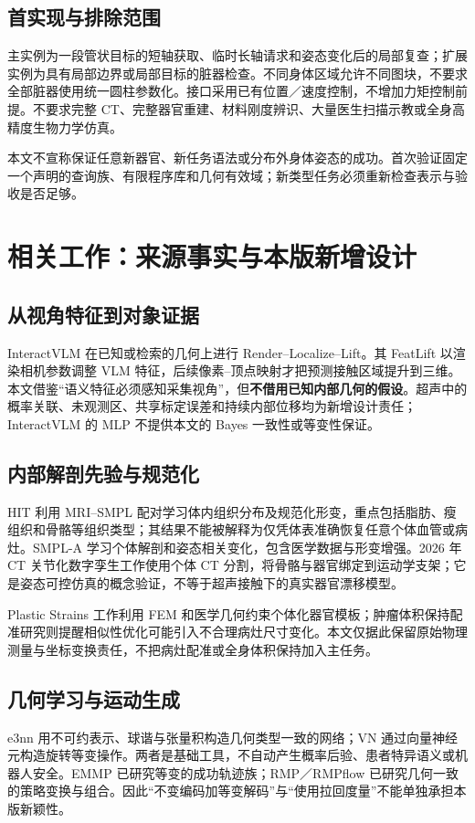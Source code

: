 \documentclass[UTF8,fontset=fandol,11pt,a4paper]{ctexart}
\theoremstyle{plain}
\theoremstyle{definition}
\theoremstyle{remark}
\numberwithin{equation}{section}
\begin{document}
\subsection{首实现与排除范围}
主实例为一段管状目标的短轴获取、临时长轴请求和姿态变化后的局部复查；扩展实例为具有局部边界或局部目标的脏器检查。不同身体区域允许不同图块，不要求全部脏器使用统一圆柱参数化。接口采用已有位置／速度控制，不增加力矩控制前提。不要求完整 CT、完整器官重建、材料刚度辨识、大量医生扫描示教或全身高精度生物力学仿真。

本文不宣称保证任意新器官、新任务语法或分布外身体姿态的成功。首次验证固定一个声明的查询族、有限程序库和几何有效域；新类型任务必须重新检查表示与验收是否足够。

\section{相关工作：来源事实与本版新增设计}
\label{sec:related}
\subsection{从视角特征到对象证据}
InteractVLM 在已知或检索的几何上进行 Render--Localize--Lift。其 FeatLift 以渲染相机参数调整 VLM 特征，后续像素--顶点映射才把预测接触区域提升到三维\cite{interact}。本文借鉴“语义特征必须感知采集视角”，但\textbf{不借用已知内部几何的假设}。超声中的概率关联、未观测区、共享标定误差和持续内部位移均为新增设计责任；InteractVLM 的 MLP 不提供本文的 Bayes 一致性或等变性保证。

\subsection{内部解剖先验与规范化}
HIT 利用 MRI--SMPL 配对学习体内组织分布及规范化形变，重点包括脂肪、瘦组织和骨骼等组织类型；其结果不能被解释为仅凭体表准确恢复任意个体血管或病灶\cite{hit}。SMPL-A 学习个体解剖和姿态相关变化，包含医学数据与形变增强\cite{smpla}。2026 年 CT 关节化数字孪生工作使用个体 CT 分割，将骨骼与器官绑定到运动学支架；它是姿态可控仿真的概念验证，不等于超声接触下的真实器官漂移模型\cite{cttwin}。

Plastic Strains 工作利用 FEM 和医学几何约束个体化器官模板\cite{plastic}；肿瘤体积保持配准研究则提醒相似性优化可能引入不合理病灶尺寸变化\cite{tumor}。本文仅据此保留原始物理测量与坐标变换责任，不把病灶配准或全身体积保持加入主任务。

\subsection{几何学习与运动生成}
e3nn 用不可约表示、球谐与张量积构造几何类型一致的网络；VN 通过向量神经元构造旋转等变操作\cite{e3nn,vn}。两者是基础工具，不自动产生概率后验、患者特异语义或机器人安全。EMMP 已研究等变的成功轨迹族\cite{emmp}；RMP／RMPflow 已研究几何一致的策略变换与组合\cite{rmpflow}。因此“不变编码加等变解码”与“使用拉回度量”不能单独承担本版新颖性。
\end{document}
